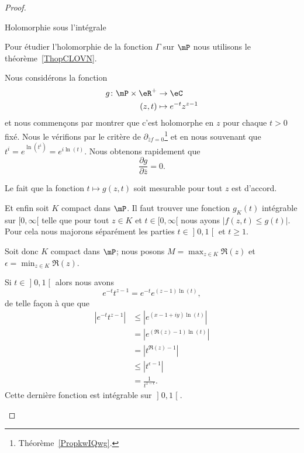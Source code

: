 \begin{proof}
	\begin{subproof}
		\item[Holomorphie sous l'intégrale]

		Pour étudier l'holomorphie de la fonction \( \Gamma\) sur \( \mP\) nous utilisons le théorème~\ref{ThopCLOVN}.

		Nous considérons la fonction
		\begin{equation}
			\begin{aligned}
				g\colon \mP\times \eR^+ & \to \eC                \\
				(z,t)                   & \mapsto  e^{-t}z^{z-1}
			\end{aligned}
		\end{equation}
		et nous commençons par montrer que c'est holomorphe en \( z\) pour chaque \( t>0\) fixé. Nous le vérifions par le critère de \( \partial_{\bar zf=0}\)\footnote{Théorème~\ref{PropkwIQwg}.} et en nous souvenant que \( t^i= e^{\ln(t^i)}= e^{i\ln(t)}\). Nous obtenons rapidement que
		\begin{equation}
			\frac{ \partial g }{ \partial \bar z }=0.
		\end{equation}

		Le fait que la fonction \( t\mapsto g(z,t)\) soit mesurable pour tout \( z\) est d'accord.

		Et enfin soit \( K\) compact dans \( \mP\). Il faut trouver une fonction \( g_K(t)\) intégrable sur \( \mathopen[ 0 , \infty [\) telle que pour tout \( z\in K\) et \( t\in\mathopen[ 0 , \infty [\) nous ayons \( | f(z,t)\leq g(t) |\). Pour cela nous majorons séparément les parties \( t\in\mathopen] 0 , 1 \mathclose[\) et \( t\geq 1\).

			Soit donc \( K\) compact dans \( \mP\); nous posons \( M=\max_{z\in K}\Re(z)\) et \( \epsilon=\min_{z\in K}\Re(z)\).

			Si \( t\in \mathopen] 0 , 1 \mathclose[\) alors nous avons
			\begin{equation}
				e^{-t}t^{z-1}= e^{-t} e^{(z-1)\ln(t)},
			\end{equation}
			de telle façon à que que
			\begin{subequations}
				\begin{align}
					|  e^{-t}t^{z-1} | & \leq|  e^{(x-1+iy)\ln(t)} |  \\
					                   & =|   e^{(\Re(z)-1)\ln(t)} |  \\
					                   & =| t^{\Re(z)-1} |            \\
					                   & \leq | t^{\epsilon-1} |      \\
					                   & =\frac{1}{ t^{1-\epsilon} }.
				\end{align}
			\end{subequations}
			Cette dernière fonction est intégrable sur \( \mathopen] 0 , 1 \mathclose[\).


\end{subproof}
\end{proof}
